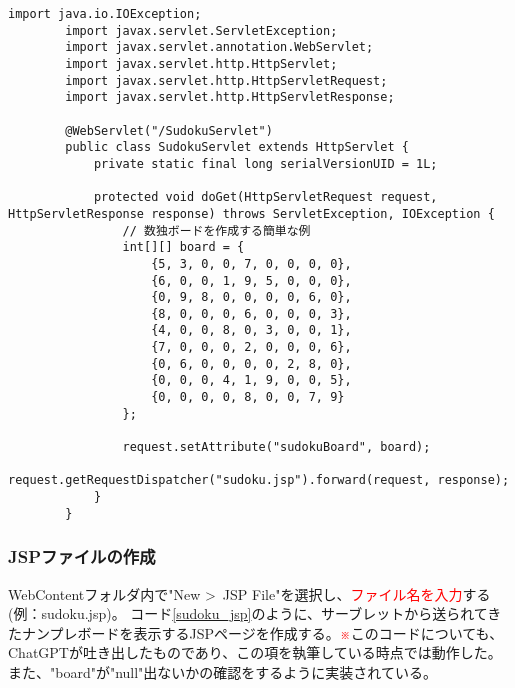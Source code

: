 \documentclass[a4paper,10pt]{jsarticle}
\begin{document}
      \begin{lstlisting}[caption="SudokuServlet"のコード例,label=sudoku_servlet]
        import java.io.IOException;
        import javax.servlet.ServletException;
        import javax.servlet.annotation.WebServlet;
        import javax.servlet.http.HttpServlet;
        import javax.servlet.http.HttpServletRequest;
        import javax.servlet.http.HttpServletResponse;

        @WebServlet("/SudokuServlet")
        public class SudokuServlet extends HttpServlet {
            private static final long serialVersionUID = 1L;

            protected void doGet(HttpServletRequest request, HttpServletResponse response) throws ServletException, IOException {
                // 数独ボードを作成する簡単な例
                int[][] board = {
                    {5, 3, 0, 0, 7, 0, 0, 0, 0},
                    {6, 0, 0, 1, 9, 5, 0, 0, 0},
                    {0, 9, 8, 0, 0, 0, 0, 6, 0},
                    {8, 0, 0, 0, 6, 0, 0, 0, 3},
                    {4, 0, 0, 8, 0, 3, 0, 0, 1},
                    {7, 0, 0, 0, 2, 0, 0, 0, 6},
                    {0, 6, 0, 0, 0, 0, 2, 8, 0},
                    {0, 0, 0, 4, 1, 9, 0, 0, 5},
                    {0, 0, 0, 0, 8, 0, 0, 7, 9}
                };

                request.setAttribute("sudokuBoard", board);
                request.getRequestDispatcher("sudoku.jsp").forward(request, response);
            }
        }
      \end{lstlisting}

    \subsubsection{JSPファイルの作成}
      WebContentフォルダ内で"New \textgreater \ JSP File"を選択し、\textcolor{red}{ファイル名を入力}する(例：sudoku.jsp)。
      コード\ref{sudoku_jsp}のように、サーブレットから送られてきたナンプレボードを表示するJSPページを作成する。\textcolor{red}{※}このコードについても、ChatGPTが吐き出したものであり、この項を執筆している時点では動作した。
      また、"board"が"null"出ないかの確認をするように実装されている。\\
\end{document}
